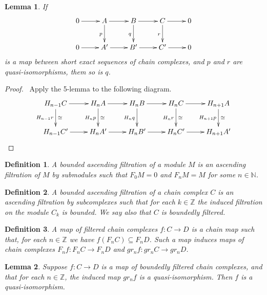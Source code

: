 \documentclass{article}
\newtheorem{lemma}{Lemma}
\newtheorem{definition}{Definition}
\begin{document}
\begin{lemma}\label{quis}
  If 
  \begin{equation}
    \xymatrix{
      0 \ar[r] & A  \ar[d]_p \ar[r] & B  \ar[d]_q\ar[r] & C  \ar[d]_r\ar[r] & 0 \\
      0 \ar[r] & A' \ar[r] & B' \ar[r] & C' \ar[r] & 0 
      }
  \end{equation}
  is a map between short exact sequences of chain complexes, and $p$ and $r$
  are quasi-isomorphisms, them so is $q$.
\end{lemma}
\begin{proof}
  \ Apply the 5-lemma to the following diagram.
  \begin{equation}
    \xymatrix{
      H_{n-1} C  \ar[d]_{H_{n-1}r}^\cong \ar[r] &
      H_n     A  \ar[d]_{H_n    p}^\cong \ar[r] &
      H_n     B  \ar[d]_{H_n    q}       \ar[r] &
      H_n     C  \ar[d]_{H_n    r}^\cong \ar[r] &
      H_{n+1} A  \ar[d]_{H_{n+1}p}^\cong
      \\
      H_{n-1} C'         \ar[r] &
      H_n     A'         \ar[r] &
      H_n     B'         \ar[r] &
      H_n     C'         \ar[r] &
      H_{n+1} A' 
      }
  \end{equation}
\end{proof}
\begin{definition} A {\em bounded} ascending filtration of a module $M$ is an ascending
      filtration of $M$ by submodules such that $F_0 M=0$ and $F_n M= M$ for some $n \in \mathbb N$.
\end{definition}
\begin{definition} A {\em bounded} ascending filtration of a chain complex $C$ is an ascending
      filtration by subcomplexes such that for each $k \in \mathbb Z$ the
      induced filtration on the module $C_k$ is bounded.  We say also that
      $C$ is {\em boundedly} filtered.
\end{definition}
\begin{definition}
  A {\em map} of filtered chain complexes $f : C \to D$ is a chain map such that,
  for each $n \in \mathbb Z$ we have $f(F_n C) \subseteq F_n D$.  Such a map
  induces maps of chain complexes $F_n f : F_n C \to F_n D$ and $gr_n f : gr_n C \to gr_n D$.
\end{definition}
\begin{lemma}
  Suppose $f : C \to D$ is a map of boundedly filtered chain complexes, and
  that for each $n \in \mathbb Z$, the induced map $gr_n f$ is a
  quasi-isomorphism.  Then $f$ is a quasi-isomorphism.
\end{lemma}
\end{document}
